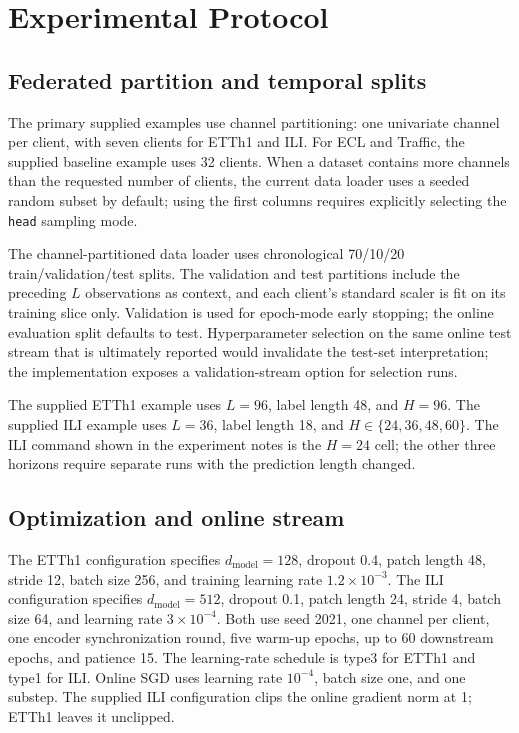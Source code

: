 \documentclass{article}
\theoremstyle{definition}
\begin{document}
\section{Experimental Protocol}

\subsection{Federated partition and temporal splits}

The primary supplied examples use channel partitioning: one univariate channel per client, with seven clients for ETTh1 and ILI. For ECL and Traffic, the supplied baseline example uses 32 clients. When a dataset contains more channels than the requested number of clients, the current data loader uses a seeded random subset by default; using the first columns requires explicitly selecting the \texttt{head} sampling mode.

The channel-partitioned data loader uses chronological 70/10/20 train/validation/test splits. The validation and test partitions include the preceding \(L\) observations as context, and each client's standard scaler is fit on its training slice only. Validation is used for epoch-mode early stopping; the online evaluation split defaults to test. Hyperparameter selection on the same online test stream that is ultimately reported would invalidate the test-set interpretation; the implementation exposes a validation-stream option for selection runs.

The supplied ETTh1 example uses \(L=96\), label length 48, and \(H=96\). The supplied ILI example uses \(L=36\), label length 18, and \(H\in\{24,36,48,60\}\). The ILI command shown in the experiment notes is the \(H=24\) cell; the other three horizons require separate runs with the prediction length changed.

\subsection{Optimization and online stream}

The ETTh1 configuration specifies \(d_{\mathrm{model}}=128\), dropout 0.4, patch length 48, stride 12, batch size 256, and training learning rate \(1.2\times10^{-3}\). The ILI configuration specifies \(d_{\mathrm{model}}=512\), dropout 0.1, patch length 24, stride 4, batch size 64, and learning rate \(3\times10^{-4}\). Both use seed 2021, one channel per client, one encoder synchronization round, five warm-up epochs, up to 60 downstream epochs, and patience 15. The learning-rate schedule is type3 for ETTh1 and type1 for ILI. Online SGD uses learning rate \(10^{-4}\), batch size one, and one substep. The supplied ILI configuration clips the online gradient norm at 1; ETTh1 leaves it unclipped.
\end{document}
